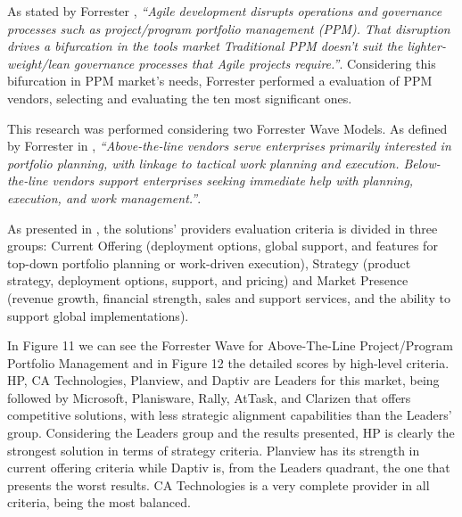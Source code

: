 As stated by Forrester \cite{forresterWavePPM}, \textit{``Agile development disrupts operations and governance processes such as project/program portfolio management (PPM). That disruption drives a bifurcation in the tools market \- Traditional PPM doesn't suit the lighter-weight/lean governance processes that Agile projects require.''}. Considering this bifurcation in PPM market's needs, Forrester performed a evaluation of PPM vendors, selecting and evaluating the ten most significant ones.\par
This research was performed considering two Forrester Wave Models. As defined by Forrester in \cite{forresterWavePPM}, \textit{``Above-the-line vendors serve enterprises primarily interested in portfolio planning, with linkage to tactical work planning and execution. Below-the-line vendors support enterprises seeking immediate help with planning, execution, and work management.''}.\par
As presented in \cite{forresterWavePPM}, the solutions' providers evaluation criteria is divided in three groups: Current Offering (deployment options, global support, and features for top-down portfolio planning or work-driven execution), Strategy (product strategy, deployment options, support, and pricing) and Market Presence (revenue growth, financial strength, sales and support services, and the ability to support global implementations).\par
In Figure 11 we can see the Forrester Wave for Above-The-Line Project/Program Portfolio Management and in Figure 12 the detailed scores by high-level criteria. HP, CA Technologies, Planview, and Daptiv are Leaders for this market, being followed by Microsoft, Planisware, Rally, AtTask, and Clarizen that offers competitive solutions, with less strategic alignment capabilities than the Leaders' group.
Considering the Leaders group and the results presented, HP is clearly the strongest solution in terms of strategy criteria. Planview has its strength in current offering criteria while Daptiv is, from the Leaders quadrant, the one that presents the worst results. CA Technologies is a very complete provider in all criteria, being the most balanced.\par



